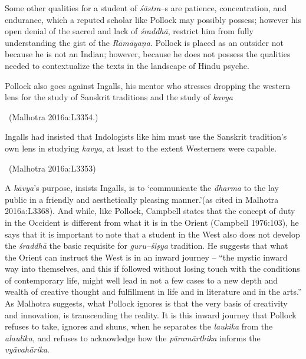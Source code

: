 Some other qualities for a student of \textit{śāstra}–s are patience, concentration, and endurance, which a reputed scholar like Pollock may possibly possess; however his open denial of the sacred and lack of \textit{śraddhā}, restrict him from fully understanding the gist of the \textit{Rāmāyaṇa}. Pollock is placed as an outsider not because he is not an Indian; however, because he does not possess the qualities needed to contextualize the texts in the landscape of Hindu psyche.

\newpage

\begin{myquote}
Pollock also goes against Ingalls, his mentor who stresses dropping the western lens for the study of Sanskrit traditions and the study of \textit{kavya} 

~\hfill (Malhotra 2016a:L3354.)
\end{myquote}

\begin{myquote}
Ingalls had insisted that Indologists like him must use the Sanskrit tradition’s own lens in studying \textit{kavya}, at least to the extent Westerners were capable. 

~\hfill (Malhotra 2016a:L3353)
\end{myquote}

A \textit{kāvya}’s purpose, insists Ingalls, is to ‘communicate the \textit{dharma} to the lay public in a friendly and aesthetically pleasing manner.’(as cited in Malhotra 2016a:L3368). And while, like Pollock, Campbell states that the concept of duty in the Occident is different from what it is in the Orient (Campbell 1976:103), he says that it is important to note that a student in the West also does not develop the \textit{śraddhā} the basic requisite for \textit{guru–śiṣya} tradition. He suggests that what the Orient can instruct the West is in an inward journey – “the mystic inward way into themselves, and this if followed without losing touch with the conditions of contemporary life, might well lead in not a few cases to a new depth and wealth of creative thought and fulfillment in life and in literature and in the arts.” As Malhotra suggests, what Pollock ignores is that the very basis of creativity and innovation, is transcending the reality. It is this inward journey that Pollock refuses to take, ignores and shuns, when he separates the \textit{laukika} from the \textit{alaulika}, and refuses to acknowledge how the \textit{pāramārthika} informs the \textit{vyāvahārika}.


